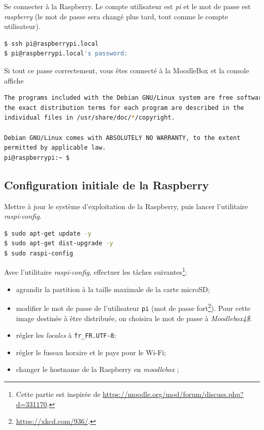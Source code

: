 \documentclass[11pt]{article}
\begin{document}
Se connecter à la Raspberry. Le compte utilisateur est \emph{pi} et le mot de passe est \emph{raspberry} (le mot de passe sera changé plus tard, tout comme le compte utilisateur).

\begin{lstlisting}[language=bash]
$ ssh pi@raspberrypi.local
$ pi@raspberrypi.local's password:
\end{lstlisting}

\begin{verification}
Si tout ce passe correctement, vous êtes connecté à la MoodleBox et la console affiche

\begin{lstlisting}[language=bash]
The programs included with the Debian GNU/Linux system are free software;
the exact distribution terms for each program are described in the
individual files in /usr/share/doc/*/copyright.

Debian GNU/Linux comes with ABSOLUTELY NO WARRANTY, to the extent
permitted by applicable law.
pi@raspberrypi:~ $
\end{lstlisting}
\end{verification}

\subsection{Configuration initiale de la Raspberry}

Mettre à jour le système d'exploitation de la Raspberry, puis lancer l'utilitaire \emph{raspi-config}.

\begin{lstlisting}[language=bash]
$ sudo apt-get update -y
$ sudo apt-get dist-upgrade -y
$ sudo raspi-config
\end{lstlisting}

Avec l'utilitaire \emph{raspi-config}, effectuer les tâches suivantes\footnote{Cette partie est inspirée de \url{https://moodle.org/mod/forum/discuss.php?d=331170}.}:
\begin{itemize}
\item agrandir la partition à la taille maximale de la carte microSD;
\item modifier le mot de passe de l'utilisateur \lstinline{pi} (mot de passe fort\footnote{\url{https://xkcd.com/936/}.}). Pour cette image destinée à être distribuée, on choisira le mot de passe à \emph{Moodlebox4\$}.
\item régler les \emph{locales} à \lstinline{fr_FR.UTF-8};
\item régler le fuseau horaire et le pays pour le Wi-Fi;
\item changer le hostname de la Raspberry en \emph{moodlebox} ;
\end{itemize}
\end{document}
